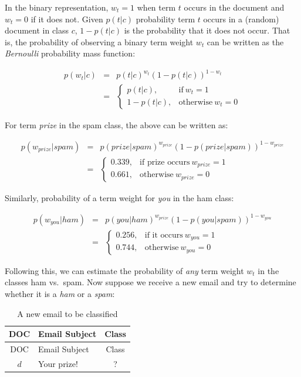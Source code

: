 \documentclass[
  letterpaper,
]{scrbook}
\begin{document}
In the binary representation, \(w_t = 1\) when term \(t\) occurs in the
document and \(w_t = 0\) if it does not. Given \(p(t|c)\) probability
term \(t\) occurs in a (random) document in class \(c\), \(1 - p(t|c)\)
is the probability that it does not occur. That is, the probability of
observing a binary term weight \(w_t\) can be written as the
\emph{Bernoulli} probability mass function:

\[\begin{aligned}
  p(w_t|c)
  & = & p(t|c)^{w_t} (1-p(t|c))^{1-w_t} \\
  & = &
  \begin{cases}
    p(t|c), & \text{if}\ w_t = 1 \\
    1-p(t|c), & \text{otherwise}\ w_t = 0
  \end{cases}
\end{aligned}\]

For term \emph{prize} in the spam class, the above can be written as:

\[\begin{aligned}
  p(w_{prize}|spam)
  & = & p(prize|spam)^{w_{prize}} (1-p(prize|spam))^{1-w_{prize}} \\
  & = &
  \begin{cases}
    0.339, & \text{if prize occurs}\ w_{prize} = 1 \\
    0.661, & \text{otherwise}\ w_{prize} = 0
  \end{cases}
\end{aligned}\]

Similarly, probability of a term weight for \emph{you} in the ham class:

\[\begin{aligned}
  p(w_{you}|ham)
  & = & p(you|ham)^{w_{prize}} (1-p(you|spam))^{1-w_{you}} \\
  & = &
  \begin{cases}
    0.256, & \text{if it occurs}\ w_{you} = 1 \\
    0.744, & \text{otherwise}\ w_{you} = 0
  \end{cases}
\end{aligned}\]

Following this, we can estimate the probability of \emph{any} term
weight \(w_t\) in the classes ham vs.~spam. Now suppose we receive a new
email and try to determine whether it is a \emph{ham} or a \emph{spam}:

\protect{}\label{tab-text-emails_new}
\begin{longtable}[]{@{}clc@{}}
\caption{A new email to be classified}\tabularnewline
\toprule\noalign{}
DOC & Email Subject & Class \\
\midrule\noalign{}
\endfirsthead
\toprule\noalign{}
DOC & Email Subject & Class \\
\midrule\noalign{}
\endhead
\bottomrule\noalign{}
\endlastfoot
\(d\) & Your prize! & ? \\
\end{longtable}
\end{document}
